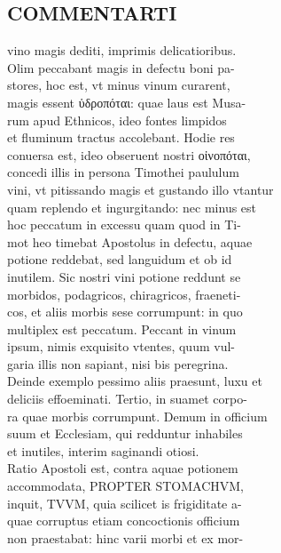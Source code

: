 \documentclass{article}
\begin{document}
\begin{pages}
\section*{COMMENTARTI \\
                }vino magis dediti, imprimis delicatioribus. \\
                Olim peccabant magis in defectu boni pa- \\
                stores, hoc est, vt minus vinum curarent, \\
                magis essent ὑδροπόται: quae laus est Musa- \\
                rum apud Ethnicos, ideo fontes limpidos \\
                et fluminum tractus accolebant. Hodie res \\
                conuersa est, ideo obseruent nostri οἰνοπόται, \\
                concedi illis in persona Timothei paululum \\
                vini, vt pitissando magis et gustando illo vtantur \\
                quam replendo et ingurgitando: nec minus est \\
                hoc peccatum in excessu quam quod in Ti- \\
                mot heo timebat Apostolus in defectu, aquae \\
                potione reddebat, sed languidum et ob id \\
                inutilem. Sic nostri vini potione reddunt se \\
                morbidos, podagricos, chiragricos, fraeneti- \\
                cos, et aliis morbis sese corrumpunt: in quo \\
                multiplex est peccatum. Peccant in vinum \\
                ipsum, nimis exquisito vtentes, quum vul- \\
                garia illis non sapiant, nisi bis peregrina. \\
                Deinde exemplo pessimo aliis praesunt, luxu et \\
                deliciis effoeminati. Tertio, in suamet corpo- \\
                ra quae morbis corrumpunt. Demum in officium \\
                suum et Ecclesiam, qui redduntur inhabiles \\
                et inutiles, interim saginandi otiosi. \\
                Ratio Apostoli est, contra aquae potionem \\
                accommodata, PROPTER STOMACHVM, \\
                inquit, TVVM, quia scilicet is frigiditate a- \\
                quae corruptus etiam concoctionis officium \\
                non praestabat: hinc varii morbi et ex mor- \\
                

\end{pages}
\end{document}

